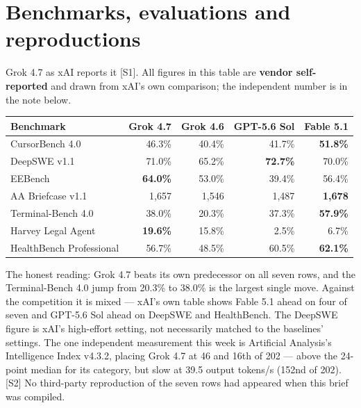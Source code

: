 \documentclass[11pt,a4paper]{article}
\newcommand{\srcref}[1]{\textcolor{brandaccent}{[S#1]}}
\begin{document}
\section{Benchmarks, evaluations and reproductions}

Grok 4.7 as xAI reports it \srcref{1}. All figures in this table are
\textbf{vendor self-reported} and drawn from xAI's own comparison; the independent
number is in the note below.

{\small
\begin{tabularx}{\textwidth}{@{}l r r r r@{}}
\toprule
\textbf{Benchmark} & \textbf{Grok 4.7} & \textbf{Grok 4.6} & \textbf{GPT-5.6 Sol} & \textbf{Fable 5.1} \\
\midrule
CursorBench 4.0          & 46.3\% & 40.4\% & 41.7\% & \textbf{51.8\%} \\
DeepSWE v1.1             & 71.0\% & 65.2\% & \textbf{72.7\%} & 70.0\% \\
EEBench                  & \textbf{64.0\%} & 53.0\% & 39.4\% & 56.4\% \\
AA Briefcase v1.1        & 1{,}657 & 1{,}546 & 1{,}487 & \textbf{1{,}678} \\
Terminal-Bench 4.0       & 38.0\% & 20.3\% & 37.3\% & \textbf{57.9\%} \\
Harvey Legal Agent       & \textbf{19.6\%} & 15.8\% & 2.5\% & 6.7\% \\
HealthBench Professional & 56.7\% & 48.5\% & 60.5\% & \textbf{62.1\%} \\
\bottomrule
\end{tabularx}}
\vspace{0.4em}

The honest reading: Grok 4.7 beats its own predecessor on all seven rows, and the
Terminal-Bench 4.0 jump from 20.3\% to 38.0\% is the largest single move. Against the
competition it is mixed --- xAI's own table shows Fable 5.1 ahead on four of seven
and GPT-5.6 Sol ahead on DeepSWE and HealthBench. The DeepSWE figure is xAI's
high-effort setting, not necessarily matched to the baselines' settings. The one
independent measurement this week is Artificial Analysis's Intelligence Index
v4.3.2, placing Grok 4.7 at 46 and 16th of 202 --- above the 24-point median for its
category, but slow at 39.5 output tokens/s (152nd of 202). \srcref{2} No third-party
reproduction of the seven rows had appeared when this brief was compiled.

\end{document}
